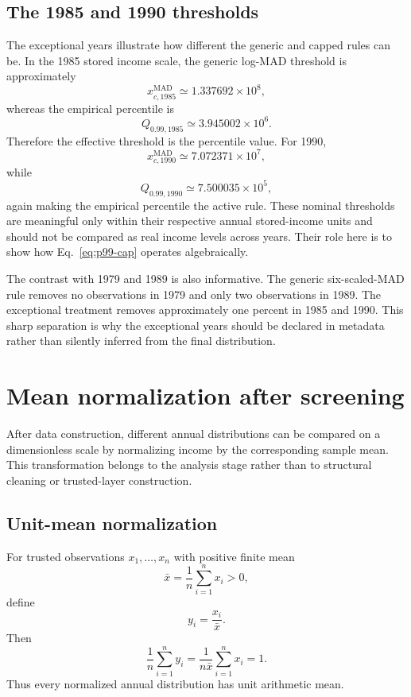 \documentclass[12pt]{article}
\newcommand{\be}{\begin{equation}}
\newcommand{\ee}{\end{equation}}
\numberwithin{equation}{section}
\begin{document}
\subsection{The 1985 and 1990 thresholds}

The exceptional years illustrate how different the generic and capped rules can be. In the 1985 stored income scale, the generic log-MAD threshold is approximately
\be
x_{c,1985}^{\mathrm{MAD}}
\simeq
1.337692\times 10^8,
\label{eq:1985-mad-cutoff}
\ee
whereas the empirical percentile is
\be
Q_{0.99,1985}
\simeq
3.945002\times10^6.
\label{eq:1985-p99}
\ee
Therefore the effective threshold is the percentile value. For 1990,
\be
x_{c,1990}^{\mathrm{MAD}}
\simeq
7.072371\times10^7,
\label{eq:1990-mad-cutoff}
\ee
while
\be
Q_{0.99,1990}
\simeq
7.500035\times10^5,
\label{eq:1990-p99}
\ee
again making the empirical percentile the active rule. These nominal thresholds are meaningful only within their respective annual stored-income units and should not be compared as real income levels across years. Their role here is to show how Eq.~\eqref{eq:p99-cap} operates algebraically.

The contrast with 1979 and 1989 is also informative. The generic six-scaled-MAD rule removes no observations in 1979 and only two observations in 1989. The exceptional treatment removes approximately one percent in 1985 and 1990. This sharp separation is why the exceptional years should be declared in metadata rather than silently inferred from the final distribution.

\section{Mean normalization after screening}

After data construction, different annual distributions can be compared on a dimensionless scale by normalizing income by the corresponding sample mean. This transformation belongs to the analysis stage rather than to structural cleaning or trusted-layer construction.

\subsection{Unit-mean normalization}

For trusted observations $x_1,\ldots,x_n$ with positive finite mean
\be
\bar{x}
=
\frac{1}{n}\sum_{i=1}^{n}x_i>0,
\label{eq:annual-mean}
\ee
define
\be
y_i
=
\frac{x_i}{\bar{x}}.
\label{eq:mean-normalization}
\ee
Then
\be
\frac{1}{n}
\sum_{i=1}^{n}y_i
=
\frac{1}{n\bar{x}}
\sum_{i=1}^{n}x_i
=
1.
\label{eq:normalized-mean}
\ee
Thus every normalized annual distribution has unit arithmetic mean.
\end{document}
